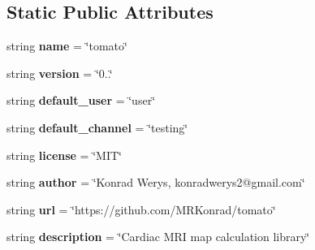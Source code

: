 \subsection*{Static Public Attributes}
\begin{DoxyCompactItemize}
\item 
string {\bfseries name} = \char`\"{}tomato\char`\"{}\hypertarget{classconanfile_1_1_tomato_conan_a26f4f87833604bd28140d0062e930f8f}{}\label{classconanfile_1_1_tomato_conan_a26f4f87833604bd28140d0062e930f8f}

\item 
string {\bfseries version} = \char`\"{}0..\char`\"{}\hypertarget{classconanfile_1_1_tomato_conan_ac4db737292ee0a860b9e468871509f36}{}\label{classconanfile_1_1_tomato_conan_ac4db737292ee0a860b9e468871509f36}

\item 
string {\bfseries default\+\_\+user} = \char`\"{}user\char`\"{}\hypertarget{classconanfile_1_1_tomato_conan_a1f839390c62b128c11967cc1000a1273}{}\label{classconanfile_1_1_tomato_conan_a1f839390c62b128c11967cc1000a1273}

\item 
string {\bfseries default\+\_\+channel} = \char`\"{}testing\char`\"{}\hypertarget{classconanfile_1_1_tomato_conan_ab7a270678d4bf3094ee5fbecf7361e78}{}\label{classconanfile_1_1_tomato_conan_ab7a270678d4bf3094ee5fbecf7361e78}

\item 
string {\bfseries license} = \char`\"{}M\+IT\char`\"{}\hypertarget{classconanfile_1_1_tomato_conan_ac0f0743fe288011bbc028362204d495f}{}\label{classconanfile_1_1_tomato_conan_ac0f0743fe288011bbc028362204d495f}

\item 
string {\bfseries author} = \char`\"{}Konrad Werys, konradwerys2@gmail.\+com\char`\"{}\hypertarget{classconanfile_1_1_tomato_conan_a059e432130ff22b36078bed2140ec9dc}{}\label{classconanfile_1_1_tomato_conan_a059e432130ff22b36078bed2140ec9dc}

\item 
string {\bfseries url} = \char`\"{}https\+://github.\+com/M\+R\+Konrad/tomato\char`\"{}\hypertarget{classconanfile_1_1_tomato_conan_af61fca8c34aeba497300fad37bf7d35b}{}\label{classconanfile_1_1_tomato_conan_af61fca8c34aeba497300fad37bf7d35b}

\item 
string {\bfseries description} = \char`\"{}Cardiac M\+RI map calculation library\char`\"{}\hypertarget{classconanfile_1_1_tomato_conan_a3c8eb0e317ab433a5fef269b3a347a21}{}\label{classconanfile_1_1_tomato_conan_a3c8eb0e317ab433a5fef269b3a347a21}


\end{DoxyCompactItemize}
